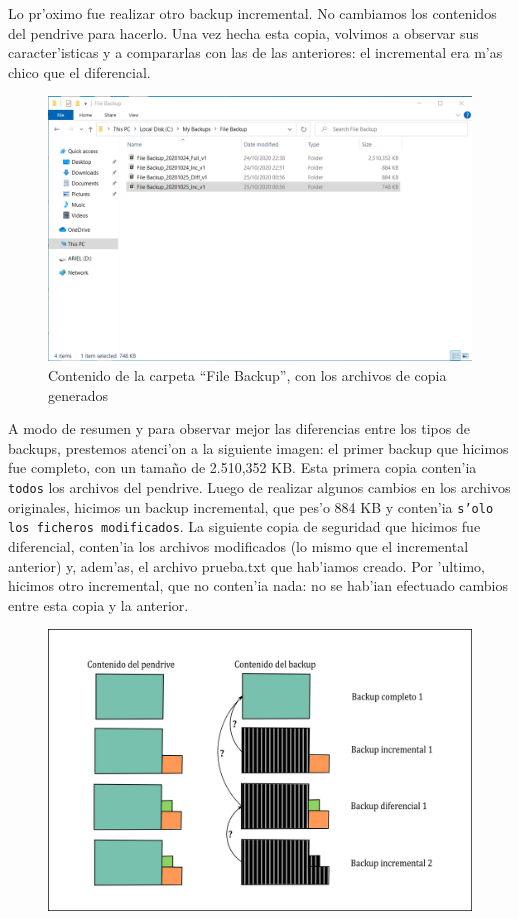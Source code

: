 \documentclass[11pt]{article}
\begin{document}
    Lo pr'oximo fue realizar otro backup incremental. No cambiamos los contenidos del pendrive para hacerlo. Una vez hecha esta copia, volvimos a observar sus caracter'isticas y a compararlas con las de las anteriores: el incremental era m'as chico que el diferencial.

    \begin{figure}[H]
		\centering
		\includegraphics[width=.8\textwidth]{Images/easeus/pendrive/11-t2_dir_3.png}
		\caption{Contenido de la carpeta ``File Backup'', con los archivos de copia generados}
		\label{imagenes_t2}
	\end{figure}
	
	A modo de resumen y para observar mejor las diferencias entre los tipos de backups, prestemos atenci'on a la siguiente imagen: el primer backup que hicimos fue completo, con un tamaño de 2.510,352 KB. Esta primera copia conten'ia \texttt{todos} los archivos del pendrive. Luego de realizar algunos cambios en los archivos originales, hicimos un backup incremental, que pes'o 884 KB y conten'ia \texttt{s'olo los ficheros modificados}.
    La siguiente copia de seguridad que hicimos fue diferencial, conten'ia los archivos modificados (lo mismo que el incremental anterior) y, adem'as, el archivo prueba.txt que hab'iamos creado.
    Por 'ultimo, hicimos otro incremental, que no conten'ia nada: no se hab'ian efectuado cambios entre esta copia y la anterior.
    
    \begin{figure}[H]
		\centering
		\includegraphics[width=.8\textwidth]{Images/easeus/pendrive/12-bp_tipos.png}
	\end{figure}
	
\end{document}
